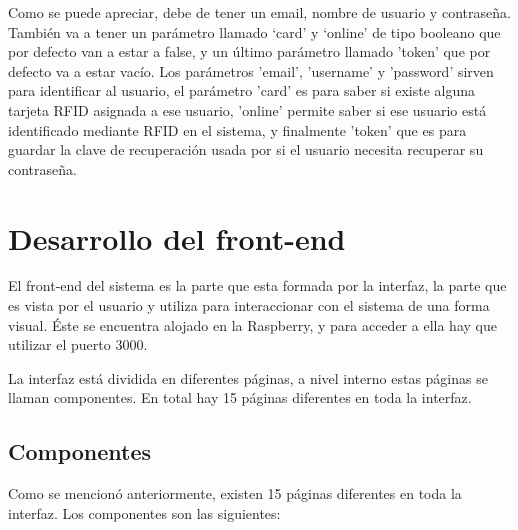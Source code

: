 Como se puede apreciar, debe de tener un email, nombre de usuario y contraseña. También va a tener un parámetro llamado ‘card’ y ‘online’ de tipo booleano que por defecto van a estar a false, y un último parámetro llamado 'token' que por defecto va a estar vacío. Los parámetros 'email', 'username' y 'password' sirven para identificar al usuario, el parámetro 'card' es para saber si existe alguna tarjeta RFID asignada a ese usuario, 'online' permite saber si ese usuario está identificado mediante RFID en el sistema, y finalmente 'token' que es para guardar la clave de recuperación usada por si el usuario necesita recuperar su contraseña.

\section{Desarrollo del front-end}
El front-end del sistema es la parte que esta formada por la interfaz, la parte que es vista por el usuario y utiliza para interaccionar con el sistema de una forma visual. Éste se encuentra alojado en la Raspberry, y para acceder a ella hay que utilizar el puerto 3000.

La interfaz está dividida en diferentes páginas, a nivel interno estas páginas se llaman componentes. En total hay 15 páginas diferentes en toda la interfaz.

\subsection{Componentes}
Como se mencionó anteriormente, existen 15 páginas diferentes en toda la interfaz. Los componentes son las siguientes:

